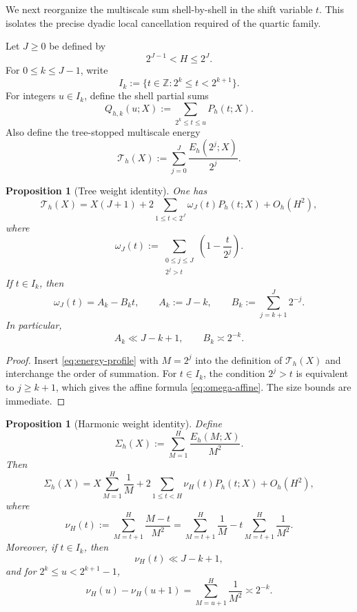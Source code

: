 \documentclass[11pt]{scrartcl}
\numberwithin{equation}{section}
\newtheorem{proposition}[theorem]{Proposition}
\theoremstyle{definition}
\newcommand{\Z}{\mathbb Z}
\newcommand{\1}{\mathbf 1}
\begin{document}
We next reorganize the multiscale sum shell-by-shell in the shift variable $t$. This isolates the precise dyadic local cancellation required of the quartic family.

Let $J\ge 0$ be defined by
\[
2^{J-1}<H\le 2^J.
\]
For $0\le k\le J-1$, write
\[
I_k:=\{t\in\Z: 2^k\le t<2^{k+1}\}.
\]
For integers $u\in I_k$, define the shell partial sums
\[
Q_{h,k}(u;X):=\sum_{2^k\le t\le u} P_h(t;X).
\]
Also define the tree-stopped multiscale energy
\[
\mathcal T_h(X):=\sum_{j=0}^{J}\frac{E_h(2^j;X)}{2^j}.
\]

\begin{proposition}[Tree weight identity]
\label{prop:tree-weight-identity}
One has
\begin{equation}
\label{eq:tree-weight-identity}
\mathcal T_h(X)=X(J+1)+2\sum_{1\le t<2^J}\omega_J(t)P_h(t;X)+O_h(H^2),
\end{equation}
where
\[
\omega_J(t):=\sum_{\substack{0\le j\le J \\ 2^j>t}}\left(1-\frac{t}{2^j}\right).
\]
If $t\in I_k$, then
\begin{equation}
\label{eq:omega-affine}
\omega_J(t)=A_k-B_kt,
\qquad
A_k:=J-k,
\qquad
B_k:=\sum_{j=k+1}^{J}2^{-j}.
\end{equation}
In particular,
\begin{equation}
\label{eq:omega-size}
A_k\ll J-k+1,
\qquad
B_k\asymp 2^{-k}.
\end{equation}
\end{proposition}

\begin{proof}
Insert \eqref{eq:energy-profile} with $M=2^j$ into the definition of $\mathcal T_h(X)$ and interchange the order of summation. For $t\in I_k$, the condition $2^j>t$ is equivalent to $j\ge k+1$, which gives the affine formula \eqref{eq:omega-affine}. The size bounds are immediate.
\end{proof}

\begin{proposition}[Harmonic weight identity]
\label{prop:harmonic-weight-identity}
Define
\[
\Sigma_h(X):=\sum_{M=1}^{H}\frac{E_h(M;X)}{M^2}.
\]
Then
\begin{equation}
\label{eq:harmonic-weight-identity}
\Sigma_h(X)=X\sum_{M=1}^{H}\frac1M+2\sum_{1\le t<H}\nu_H(t)P_h(t;X)+O_h(H^2),
\end{equation}
where
\[
\nu_H(t):=\sum_{M=t+1}^{H}\frac{M-t}{M^2}
=\sum_{M=t+1}^{H}\frac1M-t\sum_{M=t+1}^{H}\frac1{M^2}.
\]
Moreover, if $t\in I_k$, then
\begin{equation}
\label{eq:nu-size}
\nu_H(t)\ll J-k+1,
\end{equation}
and for $2^k\le u<2^{k+1}-1$,
\begin{equation}
\label{eq:nu-difference}
\nu_H(u)-\nu_H(u+1)=\sum_{M=u+1}^{H}\frac1{M^2}\asymp 2^{-k}.
\end{equation}
\end{proposition}
\end{document}
